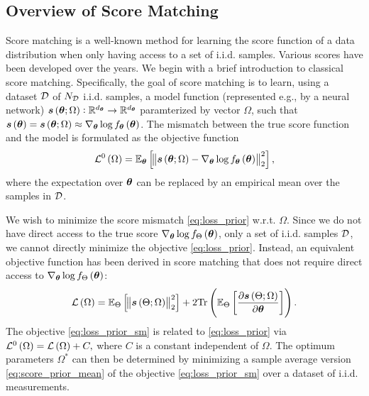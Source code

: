 \subsection{Overview of Score Matching}\label{sec:score_over_view}
Score matching\cite{hyvarinen2005estimation,hyvarinen2007some,liu2022estimating} is a well-known method for learning the score function of a data distribution when only having access to a set of i.i.d. samples. Various scores have been developed over the years. We begin with a brief introduction to classical score matching\cite{hyvarinen2005estimation}. Specifically, the goal of score matching is to learn, using a dataset $\mathcal{D}$ of $N_{\mathcal{D}}$ i.i.d. samples,
a {model} function {(represented e.g., by a neural network)} 
$\bm{s}\left(\bm{\theta};\Omega\right):\mathbb{R}^{{d_{\bm{\theta}}}}\rightarrow\mathbb{R}^{{d_{\bm{\theta}}}}$ 
{paramterized by  vector $\Omega$}, such that $\bm{s}\left(\bm{\theta}\right)=\bm{s}\left(\bm{\theta};\Omega\right)\approx\nabla_{\bm{\theta}}
    \log f_{\bm{\theta}}\left(\bm{\theta}\right)$. {%
    The mismatch between the true score function and the model} is formulated %
    as the %
    objective function
\begin{equation}\label{eq:loss_prior}
    \mathcal{L}^0\left(\Omega\right)=\mathbb{E}_{\bm{\theta}}\left[\norm{\bm{s}\left(\bm{\theta};\Omega\right)-\nabla_{\bm{\theta}}
    \log f_{\bm{\theta}}\left(\bm{\theta}\right)}_2^2\right],
\end{equation}
{where the expectation over $\bm{\theta}$ can be replaced by an empirical mean over the samples in $\mathcal{D}$. }

We wish to minimize {the score mismatch} \eqref{eq:loss_prior} w.r.t. $\Omega$. Since we do not have direct access to {the true score} $\nabla_{\bm{\theta}}\log f_{\Theta}\left(\bm{\theta}\right)$, only a set of i.i.d. samples $\mathcal{D}$, we cannot directly minimize the objective %
\eqref{eq:loss_prior}. %
Instead, an {equivalent} objective function has been {derived} in score matching\cite{hyvarinen2005estimation}
{that does not require direct access to $\nabla_{\bm{\theta}}\log f_{\Theta}\left(\bm{\theta}\right)$:%
\begin{equation}\label{eq:loss_prior_sm}
    {\mathcal{L}}\brackets{\Omega}=\expectation{\norm{\pscore{\pr;\Omega}}_2^2}{\pr}+2\trace{%
    {\expectation{\frac{\partial \pscore{\pr;\Omega}}{\partial\p}}{\pr}}}.
\end{equation}
The objective \eqref{eq:loss_prior_sm}  is related to \eqref{eq:loss_prior} via 
    ${\mathcal{L}}^0\left(\Omega\right)={\mathcal{L}}\left(\Omega\right)+C,$
where $C$ is a constant independent of $\Omega$.
The optimum parameters $\Omega^*$ can then be determined by minimizing a sample average version \eqref{eq:score_prior_mean} of the objective  \eqref{eq:loss_prior_sm} over a dataset of i.i.d. measurements.
} 

